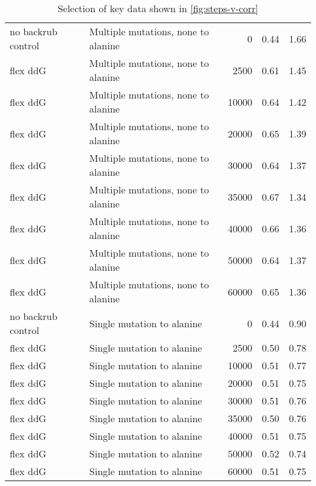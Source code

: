 \begin{table}
\begin{tabular}{llrrr}
 no backrub control &  Multiple mutations, none to alanine &             0 & 0.44 & 1.66 \\
           flex ddG &  Multiple mutations, none to alanine &          2500 & 0.61 & 1.45 \\
           flex ddG &  Multiple mutations, none to alanine &         10000 & 0.64 & 1.42 \\
           flex ddG &  Multiple mutations, none to alanine &         20000 & 0.65 & 1.39 \\
           flex ddG &  Multiple mutations, none to alanine &         30000 & 0.64 & 1.37 \\
           flex ddG &  Multiple mutations, none to alanine &         35000 & 0.67 & 1.34 \\
           flex ddG &  Multiple mutations, none to alanine &         40000 & 0.66 & 1.36 \\
           flex ddG &  Multiple mutations, none to alanine &         50000 & 0.64 & 1.37 \\
           flex ddG &  Multiple mutations, none to alanine &         60000 & 0.65 & 1.36 \\
 no backrub control &           Single mutation to alanine &             0 & 0.44 & 0.90 \\
           flex ddG &           Single mutation to alanine &          2500 & 0.50 & 0.78 \\
           flex ddG &           Single mutation to alanine &         10000 & 0.51 & 0.77 \\
           flex ddG &           Single mutation to alanine &         20000 & 0.51 & 0.75 \\
           flex ddG &           Single mutation to alanine &         30000 & 0.51 & 0.76 \\
           flex ddG &           Single mutation to alanine &         35000 & 0.50 & 0.76 \\
           flex ddG &           Single mutation to alanine &         40000 & 0.51 & 0.75 \\
           flex ddG &           Single mutation to alanine &         50000 & 0.52 & 0.74 \\
           flex ddG &           Single mutation to alanine &         60000 & 0.51 & 0.75 \\
\bottomrule
\end{tabular}

\caption[]{Selection of key data shown in \cref{fig:steps-v-corr}}
\label{tab:steps-v-corr-underlying-data}
\end{table}
